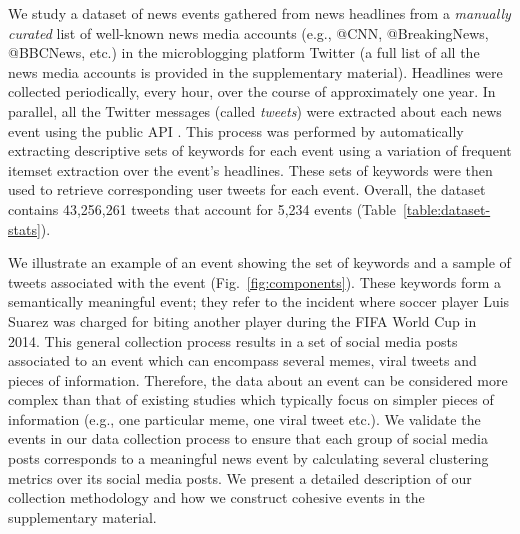 \documentclass[10pt,letterpaper]{article}
\begin{document}

We study a dataset of news events gathered from news
headlines from a \emph{manually curated} list of well-known news media
accounts (e.g., @CNN, @BreakingNews, @BBCNews, etc.) in the
microblogging platform Twitter \cite{Twitter_website}
(a full list of all the news media
accounts is provided in the supplementary material). Headlines were
collected periodically, every hour, over the course of approximately
one year. In parallel, all the Twitter messages (called \emph{tweets})
were extracted about each news event using the public
API \cite{Twitter_API}.
This process was performed by automatically extracting descriptive
sets of keywords for each event using a variation of frequent itemset
extraction \cite{Tan_Steinbach_Kumar} over the event's headlines.
These sets of keywords were then used to retrieve corresponding user
tweets for each event.  Overall, the dataset contains 43,256,261
tweets that account for 5,234 events (Table~\ref{table:dataset-stats}).

We illustrate an example of an event showing the set of keywords and a
sample of tweets associated with the event
(Fig.~\ref{fig:components}).  These keywords form a semantically
meaningful event; they refer to the incident where soccer player Luis
Suarez was charged for biting another player during the FIFA World Cup
in 2014. This general collection process results in a set of social
media posts associated to an event which can encompass several memes,
viral tweets and pieces of information. Therefore, the data about an
event can be considered more complex than that of existing studies
\cite{Castillo:2014,Szabo:2010,Lerman:2010,Tatar:2011,Pinto:2013,Ahmed:2013,suh2010want}
which typically focus on simpler pieces of information (e.g., one
particular meme, one viral tweet etc.).  We validate the events in our
data collection process to ensure that each group of social media
posts corresponds to a meaningful news event by calculating several
clustering metrics over its social media posts. We present a detailed
description of our collection methodology and how we construct
cohesive events in the supplementary material.
\end{document}
